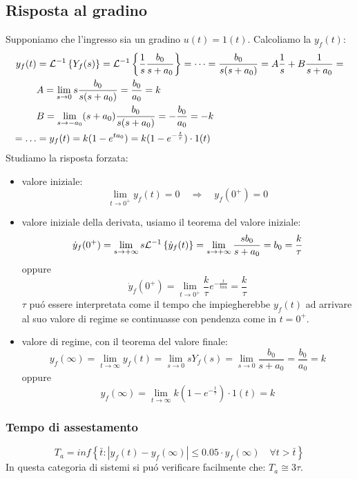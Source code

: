 \documentclass[../main.tex]{subfiles}
\begin{document}
	\subsection{Risposta al gradino}
	Supponiamo che l'ingresso sia un gradino $ u(t) = 1(t) $. Calcoliamo la $ y_f(t) $:
	\begin{align*}
		y_f(t) &= \mathcal{L}^{-1} \left\lbrace Y_f(s) \right\rbrace = \mathcal{L}^{-1} \left\lbrace \frac{1}{s} \frac{b_0}{s+a_0} \right\rbrace = \dots = \frac{b_0}{s(s+a_0)} = A\frac{1}{s} + B\frac{1}{s+a_0} = \\
		&A = \lim_{s \to 0} s \frac{b_0}{s(s+a_0)} = \frac{b_0}{a_0} = k\\
		&B = \lim_{s \to -a_0} (s+a_0)\frac{b_0}{s(s+a_0)} = -\frac{b_0}{a_0} = -k\\
		= \dots &= y_f(t) = k (1-e^{t a_0}) = k(1-e^{-\frac{t}{\tau}}) \cdot 1(t)
	\end{align*}
	Studiamo la risposta forzata:
	\begin{itemize}
		\item valore iniziale:
		\[ \lim_{t \to 0^+} y_f(t) = 0 \quad \Rightarrow \quad y_f(0^+) = 0 \]
		\item valore iniziale della derivata, usiamo il teorema del valore iniziale:
		\[ \dot y_f(0^+) = \lim_{s \to +\infty} s \mathcal{L}^{-1} \left\lbrace \dot y_f(t) \right\rbrace = \lim_{s \to +\infty} \frac{s b_0}{s+a_0} = b_0 = \frac{k}{\tau}\]
		oppure
		\[ \dot y_f(0^+) = \lim_{t \to 0^+} \frac{k}{\tau} e^{-\frac{t}{tau}} = \frac{k}{\tau} \]
		$ \tau $ pu\'o essere interpretata come il tempo che impiegherebbe $ y_f(t) $ ad arrivare al suo valore di regime se continuasse con pendenza come in $ t = 0^+ $.
		\item valore di regime, con il teorema del valore finale:
		\[ y_f(\infty) = \lim_{t \to \infty} y_f(t) = \lim_{s \to 0} s Y_f(s) = \lim_{s \to 0} \frac{b_0}{s+a_0} = \frac{b_0}{a_0} = k\]
		oppure
		\[ y_f(\infty) = \lim_{t \to \infty} k(1-e^{-\frac{t}{\tau}}) \cdot 1(t) = k \]
	\end{itemize}
	\subsubsection{Tempo di assestamento}
	\[ T_a = inf \left\lbrace \bar t : | y_f(t) - y_f(\infty) | \leq 0.05 \cdot y_f(\infty) \quad \forall t > \bar t \right\rbrace  \]
	In questa categoria di sistemi si pu\'o verificare facilmente che: $ T_a \cong 3\tau $.\\
\end{document}
